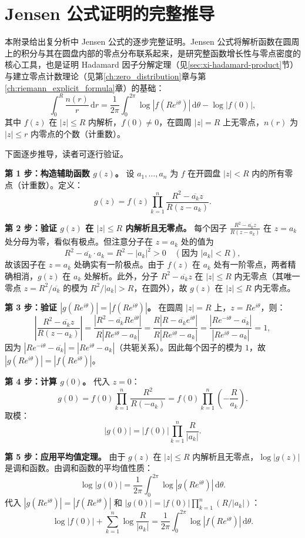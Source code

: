 
\chapter{Jensen 公式证明的完整推导}
\label{app:jensen}

本附录给出复分析中 Jensen 公式的逐步完整证明。Jensen 公式将解析函数在圆周上的积分与其在圆盘内部的零点分布联系起来，是研究整函数增长性与零点密度的核心工具，也是证明 Hadamard 因子分解定理（见\ref{sec:xi-hadamard-product}节）与建立零点计数理论（见第\ref{ch:zero_distribution}章与第\ref{ch:riemann_explicit_formula}章）的基础：
\[
  \int_0^R \frac{n(r)}{r}\,\mathrm{d}r
  = \frac{1}{2\pi}\int_0^{2\pi}\log|f(Re^{i\theta})|\,\mathrm{d}\theta
  - \log|f(0)|,
\]
其中 $f(z)$ 在 $|z|\le R$ 内解析，$f(0)\neq 0$，在圆周 $|z|=R$ 上无零点，$n(r)$ 为 $|z|\le r$ 内零点的个数（计重数）。

下面逐步推导，读者可逐行验证。

\textbf{第 1 步：构造辅助函数 $g(z)$。}
设 $a_1, \dots, a_n$ 为 $f$ 在开圆盘 $|z| < R$ 内的所有零点（计重数）。定义：
\[
  g(z) = f(z) \prod_{k=1}^n \frac{R^2 - \overline{a_k} z}{R(z - a_k)}.
\]

\textbf{第 2 步：验证 $g(z)$ 在 $|z| \le R$ 内解析且无零点。}
每个因子 $\frac{R^2 - \overline{a_k} z}{R(z - a_k)}$ 在 $z=a_k$ 处分母为零，看似有极点。但注意分子在 $z=a_k$ 处的值为
\[
  R^2 - \overline{a_k}\cdot a_k = R^2 - |a_k|^2 > 0
  \quad (\text{因为 } |a_k| < R),
\]
故该因子在 $z=a_k$ 处确实有一阶极点。由于 $f(z)$ 在 $a_k$ 处有一阶零点，两者精确相消，$g(z)$ 在 $a_k$ 处解析。此外，分子 $R^2 - \overline{a_k}z$ 在 $|z|\le R$ 内无零点（其唯一零点 $z=R^2/\overline{a_k}$ 的模为 $R^2/|a_k|>R$，在圆外），故 $g(z)$ 在 $|z|\le R$ 内无零点。

\textbf{第 3 步：验证 $|g(Re^{i\theta})| = |f(Re^{i\theta})|$。}
在圆周 $|z| = R$ 上，$z = Re^{i\theta}$，则：
\[
  \left| \frac{R^2 - \overline{a_k} z}{R(z - a_k)} \right|
  = \frac{|R^2 - \overline{a_k} Re^{i\theta}|}{R|Re^{i\theta} - a_k|}
  = \frac{R|R - \overline{a_k} e^{i\theta}|}{R|Re^{i\theta} - a_k|}
  = \frac{|Re^{-i\theta} - \overline{a_k}|}{|Re^{i\theta} - a_k|}
  = 1,
\]
因为 $|Re^{-i\theta} - \overline{a_k}| = |Re^{i\theta} - a_k|$（共轭关系）。因此每个因子的模为 $1$，故 $|g(Re^{i\theta})| = |f(Re^{i\theta})|$。

\textbf{第 4 步：计算 $g(0)$。}
代入 $z=0$：
\[
  g(0) = f(0) \prod_{k=1}^n \frac{R^2}{R(-a_k)} = f(0) \prod_{k=1}^n \left(-\frac{R}{a_k}\right).
\]
取模：
\[
  |g(0)| = |f(0)| \prod_{k=1}^n \frac{R}{|a_k|}.
\]

\textbf{第 5 步：应用平均值定理。}
由于 $g(z)$ 在 $|z| \le R$ 内解析且无零点，$\log|g(z)|$ 是调和函数。由调和函数的平均值性质：
\[
  \log|g(0)| = \frac{1}{2\pi} \int_0^{2\pi} \log|g(Re^{i\theta})| \,\mathrm{d}\theta.
\]
代入 $|g(Re^{i\theta})| = |f(Re^{i\theta})|$ 和 $|g(0)| = |f(0)| \prod_{k=1}^n (R/|a_k|)$：
\[
  \log|f(0)| + \sum_{k=1}^n \log\frac{R}{|a_k|}
  = \frac{1}{2\pi} \int_0^{2\pi} \log|f(Re^{i\theta})| \,\mathrm{d}\theta.
\]

